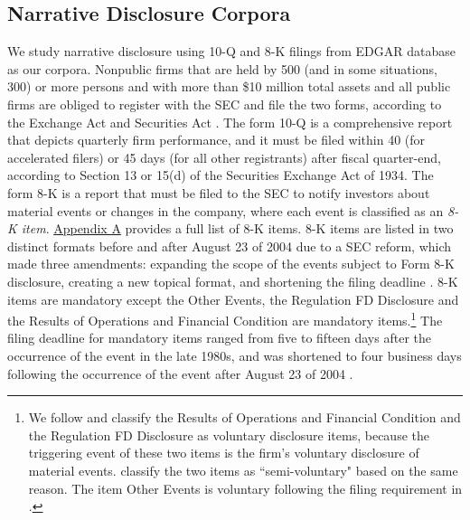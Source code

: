 \documentclass[letterpaper,12pt]{article}
\begin{document}
\begin{spacing}{1.5}
\subsection{Narrative Disclosure Corpora} \label{sec3.2}
\noindent We study narrative disclosure using 10-Q and 8-K filings from EDGAR database as our corpora. Nonpublic firms that are held by 500 (and in some situations, 300) or more persons and with more than \$10 million total assets and all public firms are obliged to register with the SEC and file the two forms, according to the Exchange Act and Securities Act \cite{segalAreManagersStrategic2016}. The form 10-Q is a comprehensive report that depicts quarterly firm performance, and it must be filed within 40 (for accelerated filers) or 45 days (for all other registrants) after fiscal quarter-end, according to Section 13 or 15(d) of the Securities Exchange Act of 1934. The form 8-K is a report that must be filed to the SEC to notify investors about material events or changes in the company, where each event is classified as an \textit{8-K item}. \hyperref[appa]{Appendix A} provides a full list of 8-K items. 8-K items are listed in two distinct formats before and after August 23 of 2004 due to a SEC reform, which made three amendments: expanding the scope of the events subject to Form 8-K disclosure, creating a new topical format, and shortening the filing deadline \cite{secFinalRuleAdditional2004, lermanNewForm8K2010}. 8-K items are mandatory except the Other Events, the Regulation FD Disclosure and the Results of Operations and Financial Condition are mandatory items.\footnote{We follow  and classify the Results of Operations and Financial Condition and the Regulation FD Disclosure as voluntary disclosure items, because the triggering event of these two items is the firm's voluntary disclosure of material events.  classify the two items as ``semi-voluntary" based on the same reason. The item Other Events is voluntary following the filing requirement in . } The filing deadline for mandatory items ranged from five to fifteen days after the occurrence of the event in the late 1980s, and was shortened to four business days following the occurrence of the event after August 23 of 2004 \cite{lermanNewForm8K2010}.


\end{spacing}
\end{document}
